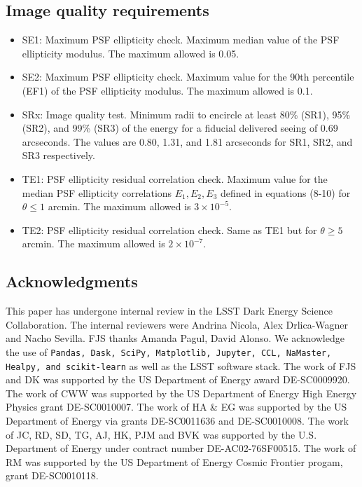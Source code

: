 \documentclass[a4paper,fleqn,usenatbib]{mnras}
\begin{document}
\subsection{Image quality requirements}
\begin{itemize}

\item SE1: Maximum PSF ellipticity check. Maximum median value of the PSF ellipticity modulus. The maximum allowed is 0.05.
\item SE2: Maximum PSF ellipticity check. Maximum value for the 90th percentile (EF1) of the PSF ellipticity modulus. The maximum allowed is 0.1.
\item SRx: Image quality test. Minimum radii to encircle at least 80\% (SR1), 95\% (SR2), and 99\% (SR3) of the energy for a fiducial delivered seeing of 0.69 arcseconds. The values are 0.80, 1.31, and 1.81 arcseconds for SR1, SR2, and SR3 respectively.
\item TE1: PSF ellipticity residual correlation check. Maximum value for the median PSF ellipticity correlations $E_{1}, E_{2}, E_{3}$ defined in equations (8-10) for $\theta \leq 1$ arcmin. The maximum allowed is $3 \times 10^{-5}$.
\item TE2: PSF ellipticity residual correlation check. Same as TE1 but for $\theta \geq 5$ arcmin. The maximum allowed is $2 \times 10^{-7}$. 
\end{itemize}
\subsection*{Acknowledgments}
This paper has undergone internal review in the LSST Dark Energy Science Collaboration. The internal reviewers were Andrina Nicola, Alex Drlica-Wagner and Nacho Sevilla.
FJS thanks Amanda Pagul, David Alonso. We acknowledge the use of \texttt{Pandas, Dask, SciPy, Matplotlib, Jupyter, CCL, \texttt{NaMaster}, Healpy, and scikit-learn} as well as the LSST software stack.
The work of FJS and DK was supported by the US Department of Energy award DE-SC0009920. The work of CWW was supported by the US Department of Energy High Energy Physics grant DE-SC0010007. The work of HA \& EG was supported by the US Department of Energy via grants DE-SC0011636 and DE-SC0010008. The work of JC, RD, SD, TG, AJ, HK, PJM and BVK was supported by the U.S. Department of Energy under contract number DE-AC02-76SF00515. The work of RM was supported by the US Department of Energy Cosmic Frontier progam, grant DE-SC0010118. 







\end{document}
